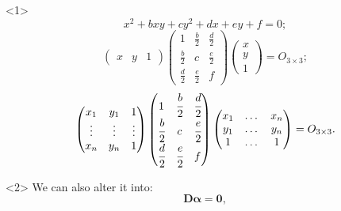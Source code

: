 \documentclass[aspectratio=169]{beamer}
\begin{document}
\begin{frame}
\begin{columns}
            \begin{column}{0.6\linewidth}
                \begin{onlyenv}<1>
                    $$x^2 + bxy +cy^2+dx+ey+f=0;$$
                    $$\begin{pmatrix}
                        x & y & 1
                    \end{pmatrix}
                    \begin{pmatrix}
                        1 & \frac{b}{2} & \frac{d}{2} \\
                        \frac{b}{2} & c & \frac{e}{2} \\
                        \frac{d}{2} & \frac{e}{2} & f
                    \end{pmatrix}
                    \begin{pmatrix}
                        x\\y\\1
                    \end{pmatrix} = O_{3\times3};$$
                    \begin{align*}
                        \begin{pmatrix}
                            x_1 & y_1 & 1 \\
                            \vdots & \vdots & \vdots \\
                            x_n & y_n & 1
                        \end{pmatrix}
                        \begin{pmatrix}
                            1 & \cfrac{b}{2} & \cfrac{d}{2} \\
                            \cfrac{b}{2} & c & \cfrac{e}{2} \\
                            \cfrac{d}{2} & \cfrac{e}{2} & f
                        \end{pmatrix}
                        \begin{pmatrix}
                            x_1 & \dots & x_n\\y_1 & \dots & y_n\\1 & \dots &1
                        \end{pmatrix} = O_{3\times3}.
                    \end{align*}
                \end{onlyenv}
                \begin{onlyenv}<2>
                    We can also alter it into:
                    \[\mathbf{D} \mathbf{\alpha} = \mathbf{0},\]

\end{onlyenv}
\end{column}
\end{columns}
\end{frame}
\end{document}
